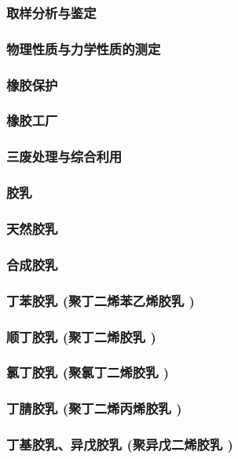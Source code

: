 \documentclass[UTF8]{../../ApplicationUniverse}
\begin{document}
        \subsubsection{取样分析与鉴定}
        \subsubsection{物理性质与力学性质的测定}
        \subsubsection{橡胶保护}
    \subsubsection{橡胶工厂}
    \subsubsection{三废处理与综合利用}
\subsubsection{胶乳}
    \subsubsection{天然胶乳}
    \subsubsection{合成胶乳}
        \subsubsection{丁苯胶乳 (聚丁二烯苯乙烯胶乳 )}
            \subsubsection{顺丁胶乳 (聚丁二烯胶乳 )}
        \subsubsection{氯丁胶乳 (聚氯丁二烯胶乳 )}
        \subsubsection{丁腈胶乳 (聚丁二烯丙烯胶乳 )}
        \subsubsection{丁基胶乳、异戊胶乳 (聚异戊二烯胶乳 )}
\end{document}
